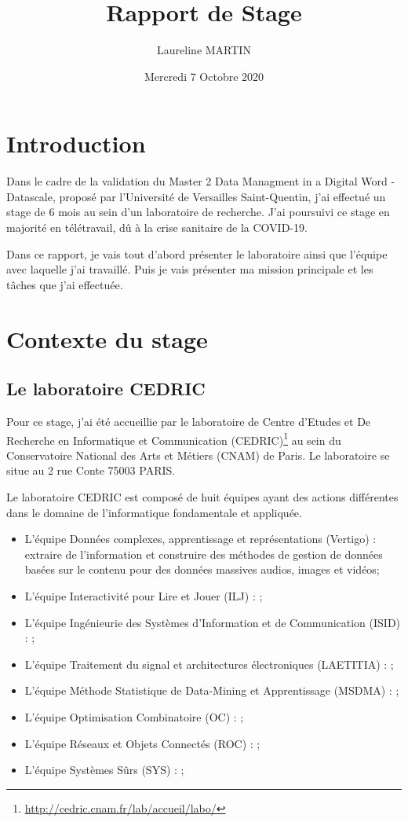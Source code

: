 \documentclass{article}
\title{Rapport de Stage}
\author{Laureline MARTIN}
\date{Mercredi 7 Octobre 2020}
\begin{document}
\maketitle

\newpage
\renewcommand{\contentsname}{Table des matières}\tableofcontents

\newpage
\section{Introduction}
	Dans le cadre de la validation du Master 2 Data Managment in a Digital Word - Datascale, proposé par l'Université de Versailles Saint-Quentin, j'ai effectué un stage de 6 mois au sein d'un laboratoire de recherche.
	J'ai poursuivi ce stage en majorité en télétravail, dû à la crise sanitaire de la COVID-19.\par
	Dans ce rapport, je vais tout d'abord présenter le laboratoire ainsi que l'équipe avec laquelle j'ai travaillé. Puis je vais présenter ma mission principale et les tâches que j'ai effectuée.

\section{Contexte du stage}
	\subsection{Le laboratoire CEDRIC}
		Pour ce stage, j'ai été accueillie par le laboratoire de Centre d'Etudes et De Recherche en Informatique et Communication (CEDRIC)\footnote{\href{http://cedric.cnam.fr/lab/accueil/labo/}{http://cedric.cnam.fr/lab/accueil/labo/}} au sein du Conservatoire National des Arts et Métiers (CNAM) de Paris. 
		Le laboratoire se situe au 2 rue Conte 75003 PARIS.\par
		Le laboratoire CEDRIC est composé de huit équipes ayant des actions différentes dans le domaine de l'informatique fondamentale et appliquée.
		\begin{itemize}
			\item L'équipe Données complexes, apprentissage et représentations (Vertigo) : extraire de l'information et construire des méthodes de gestion de données basées sur le contenu pour des données massives audios, images et vidéos;
			\item L'équipe Interactivité pour Lire et Jouer (ILJ) : ;
			\item L'équipe Ingénieurie des Systèmes d'Information et de Communication (ISID) : ;
			\item L'équipe Traitement du signal et architectures électroniques (LAETITIA) : ;
			\item L'équipe Méthode Statistique de Data-Mining et Apprentissage (MSDMA) : ;
			\item L'équipe Optimisation Combinatoire (OC) : ;
			\item L'équipe Réseaux et Objets Connectés (ROC) : ;
			\item L'équipe Systèmes Sûrs (SYS) : ;
		\end{itemize}
\end{document}
